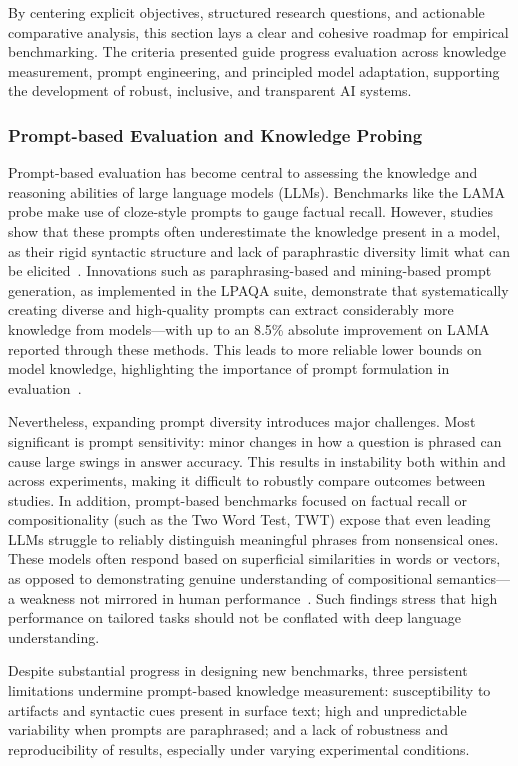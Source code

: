 \documentclass[sigconf]{acmart}
\begin{document}
By centering explicit objectives, structured research questions, and actionable comparative analysis, this section lays a clear and cohesive roadmap for empirical benchmarking. The criteria presented guide progress evaluation across knowledge measurement, prompt engineering, and principled model adaptation, supporting the development of robust, inclusive, and transparent AI systems.

\subsubsection{Prompt-based Evaluation and Knowledge Probing}

Prompt-based evaluation has become central to assessing the knowledge and reasoning abilities of large language models (LLMs). Benchmarks like the LAMA probe make use of cloze-style prompts to gauge factual recall. However, studies show that these prompts often underestimate the knowledge present in a model, as their rigid syntactic structure and lack of paraphrastic diversity limit what can be elicited~\cite{ref98}. Innovations such as paraphrasing-based and mining-based prompt generation, as implemented in the LPAQA suite, demonstrate that systematically creating diverse and high-quality prompts can extract considerably more knowledge from models---with up to an 8.5\% absolute improvement on LAMA reported through these methods. This leads to more reliable lower bounds on model knowledge, highlighting the importance of prompt formulation in evaluation~\cite{ref98}.

Nevertheless, expanding prompt diversity introduces major challenges. Most significant is prompt sensitivity: minor changes in how a question is phrased can cause large swings in answer accuracy. This results in instability both within and across experiments, making it difficult to robustly compare outcomes between studies. In addition, prompt-based benchmarks focused on factual recall or compositionality (such as the Two Word Test, TWT) expose that even leading LLMs struggle to reliably distinguish meaningful phrases from nonsensical ones. These models often respond based on superficial similarities in words or vectors, as opposed to demonstrating genuine understanding of compositional semantics---a weakness not mirrored in human performance~\cite{ref96}. Such findings stress that high performance on tailored tasks should not be conflated with deep language understanding.

Despite substantial progress in designing new benchmarks, three persistent limitations undermine prompt-based knowledge measurement: susceptibility to artifacts and syntactic cues present in surface text; high and unpredictable variability when prompts are paraphrased; and a lack of robustness and reproducibility of results, especially under varying experimental conditions.
\end{document}
